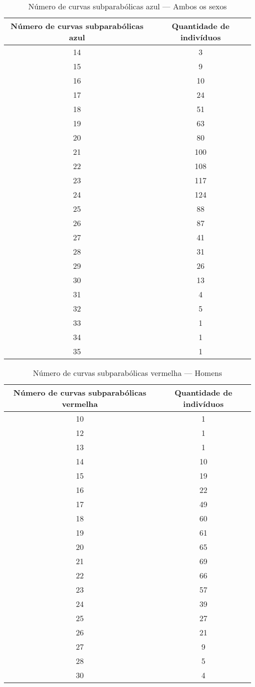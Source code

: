 \documentclass[a4paper,12pt]{article}
\begin{document}
\begin{table}[h!]
\centering
\caption{Número de curvas subparabólicas azul — Ambos os sexos}
\begin{tabular}{c c}
\hline
\textbf{Número de curvas subparabólicas azul} & \textbf{Quantidade de indivíduos} \\ 
\hline
14 & 3  \\
15 & 9  \\
16 & 10 \\
17 & 24 \\
18 & 51 \\
19 & 63 \\
20 & 80 \\
21 & 100 \\
22 & 108 \\
23 & 117 \\
24 & 124 \\
25 & 88 \\
26 & 87 \\
27 & 41 \\
28 & 31 \\
29 & 26 \\
30 & 13 \\
31 & 4  \\
32 & 5  \\
33 & 1  \\
34 & 1  \\
35 & 1  \\
\hline
\end{tabular}
\end{table}


\begin{table}[h!]
\centering
\caption{Número de curvas subparabólicas vermelha — Homens}
\begin{tabular}{c c}
\hline
\textbf{Número de curvas subparabólicas vermelha} & \textbf{Quantidade de indivíduos} \\ 
\hline
10 & 1  \\
12 & 1  \\
13 & 1  \\
14 & 10 \\
15 & 19 \\
16 & 22 \\
17 & 49 \\
18 & 60 \\
19 & 61 \\
20 & 65 \\
21 & 69 \\
22 & 66 \\
23 & 57 \\
24 & 39 \\
25 & 27 \\
26 & 21 \\
27 & 9  \\
28 & 5  \\
30 & 4  \\
\hline
\end{tabular}
\end{table}
\end{document}
